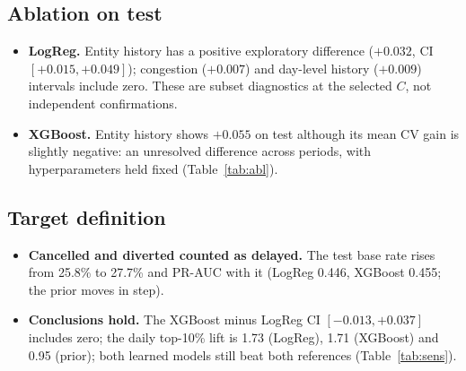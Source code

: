 \documentclass[conference]{IEEEtran}
\newcommand{\tabsize}{\footnotesize}
\begin{document}
\subsection{Ablation on test}
\begin{itemize}
\item \textbf{LogReg.} Entity history has a positive exploratory difference ($+0.032$, CI $[+0.015,+0.049]$); congestion ($+0.007$) and day-level history ($+0.009$) intervals include zero. These are subset diagnostics at the selected $C$, not independent confirmations.
\item \textbf{XGBoost.} Entity history shows $+0.055$ on test although its mean CV gain is slightly negative: an unresolved difference across periods, with hyperparameters held fixed (Table~\ref{tab:abl}).
\end{itemize}

\begin{table}[!t]
\caption[Ablation: CV gains and exploratory test differences.]{Ablation steps: CV gain (selection evidence) and test difference with 95\% CI (exploratory).}
\label{tab:abl}
\centering\tabsize

\end{table}

\subsection{Target definition}
\begin{itemize}
\item \textbf{Cancelled and diverted counted as delayed.} The test base rate rises from 25.8\% to 27.7\% and PR-AUC with it (LogReg 0.446, XGBoost 0.455; the prior moves in step).
\item \textbf{Conclusions hold.} The XGBoost minus LogReg CI $[-0.013,+0.037]$ includes zero; the daily top-10\% lift is 1.73 (LogReg), 1.71 (XGBoost) and 0.95 (prior); both learned models still beat both references (Table~\ref{tab:sens}).
\end{itemize}

\begin{table}[!t]
\caption{Target sensitivity: cancelled and diverted flights counted as delayed.}
\label{tab:sens}
\centering\tabsize

\end{table}
\end{document}
